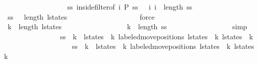 \begin{isabellebody}
\ \ \ \ \ \ \ \ \ \ \ \ \ \ \ \ \isamarkupfalse%
\ ss\ inside{\isacharunderscore}filter{\isacharbrackleft}of\ {\isachardoublequoteopen}i{\isacharminus}{}{\isachardoublequoteclose}\ {\isacharquery}P\ {\isacharquery}ss{\isacharbrackright}\ {\isacharbackquoteopen}{}\ {\isacharless}\ i{\isacharbackquoteclose}\ {\isacharbackquoteopen}i\ {\isacharless}\ length\ ss{\isacharbackquoteclose}\isanewline
\ \ \ \ \ \ \ \ \ \ \ \ \ \ \ \ \isamarkupfalse%
\ {\isacharbackquoteopen}ss\ {\isasymnoteq}\ {\isacharbrackleft}{\isacharbrackright}{\isacharbackquoteclose}\ {\isacharbackquoteopen}length\ l{\isacharunderscore}states\ {\isasymge}\ {}{\isacharbackquoteclose}\isanewline
\ \ \ \ \ \ \ \ \ \ \ \ \ \ \ \ \isamarkupfalse%
\ force\isanewline
\ \ \ \ \ \ \ \ \ \ \ \ \ \ \isamarkupfalse%
\ {\isachardoublequoteopen}k{}\ {\isacharless}\ length\ l{\isacharunderscore}states{\isachardoublequoteclose}\isanewline
\ \ \ \ \ \ \ \ \ \ \ \ \ \ \ \ \isamarkupfalse%
\ {\isacharbackquoteopen}k{}\ {\isacharless}\ length\ {\isacharquery}ss{\isacharbackquoteclose}\isanewline
\ \ \ \ \ \ \ \ \ \ \ \ \ \ \ \ \isamarkupfalse%
\ simp\isanewline
\ \ \ \ \ \ \ \ \ \ \ \ \ \ \isamarkupfalse%
\ {\isachardoublequoteopen}{\isacharquery}ss\ {\isacharbang}\ k{}\ {\isacharequal}\ {\isacharparenleft}l{\isacharunderscore}states\ {\isacharbang}\ k{}{\isacharcomma}\ labeled{\isacharunderscore}move{\isacharunderscore}positions\ {\isacharparenleft}l{\isacharunderscore}states\ {\isacharbang}\ k{}{\isacharparenright}\ {\isacharparenleft}l{\isacharunderscore}states\ {\isacharbang}\ {\isacharparenleft}k{}{\isacharplus}{}{\isacharparenright}{\isacharparenright}{\isacharparenright}{\isachardoublequoteclose}\isanewline
\ \ \ \ \ \ \ \ \ \ \ \ \ \ \ \ \ \ \ {\isachardoublequoteopen}{\isacharquery}ss\ {\isacharbang}\ k{}\ {\isacharequal}\ {\isacharparenleft}l{\isacharunderscore}states\ {\isacharbang}\ k{}{\isacharcomma}\ labeled{\isacharunderscore}move{\isacharunderscore}positions\ {\isacharparenleft}l{\isacharunderscore}states\ {\isacharbang}\ k{}{\isacharparenright}\ {\isacharparenleft}l{\isacharunderscore}states\ {\isacharbang}\ {\isacharparenleft}k{}{\isacharplus}{}{\isacharparenright}{\isacharparenright}{\isacharparenright}{\isachardoublequoteclose}\isanewline
\ \ \ \ \ \ \ \ \ \ \ \ \ \ \ \ \isamarkupfalse%

\end{isabellebody}
